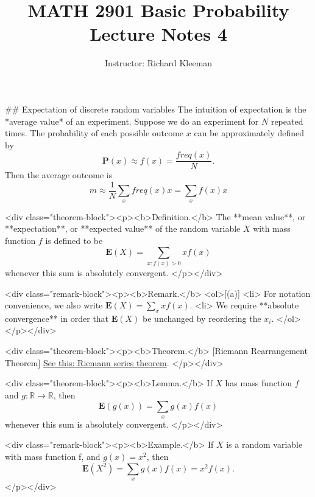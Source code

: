 


\title{MATH 2901 Basic Probability Lecture Notes 4}
\author{Instructor: Richard Kleeman}
\date{}
\maketitle


## Expectation of discrete random variables
The intuition of expectation is the *average value* of an experiment. Suppose we do an experiment for $N$ repeated times. The probability of each possible outcome $x$ can be approximately defined by 
$$\begin{equation}
    \mathbf{P}(x) \approx f(x) = \frac{freq(x)}{N}.
\end{equation}$$
Then the average outcome is
$$\begin{equation}
    m \approx \frac{1}{N}\sum_{x} freq(x)x = \sum_x f(x)x
\end{equation}$$

<div class="theorem-block"><p><b>Definition.</b> 
The **mean value**, or **expectation**, or **expected value** of the random variable $X$ with mass function $f$ is defined to be 
$$\begin{equation}
    \mathbf{E}(X) = \sum_{x:f(x)>0} xf(x)
\end{equation}$$
whenever this sum is absolutely convergent.
</p></div>

<div class="remark-block"><p><b>Remark.</b> 
<ol>[(a)]
    <li> For notation convenience, we also write $\mathbf{E}(X) = \sum_x xf(x)$.
    <li> We require **absolute convergence** in order that $\mathbf{E}(X)$ be unchanged by reordering the $x_i$. 
</ol>
</p></div>

<div class="theorem-block"><p><b>Theorem.</b> [Riemann Rearrangement Theorem] \href{https://en.wikipedia.org/wiki/Riemann_series_theorem}{See this: Riemann series theorem}.
</p></div>

<div class="theorem-block"><p><b>Lemma.</b> 
If $X$ has mass function $f$ and $g:\mathbb{R}\to\mathbb{R}$, then
$$\begin{equation}
    \mathbf{E}(g(x)) = \sum_x g(x) f(x)
\end{equation}$$
whenever this sum is absolutely convergent.
</p></div>

<div class="remark-block"><p><b>Example.</b> 
If $X$ is a random variable with mass function f, and $g(x) = x^2$, then 
$$\begin{equation}
    \mathbf{E}(X^2) = \sum_x g(x)f(x) = x^2 f(x).
\end{equation}$$
</p></div>

